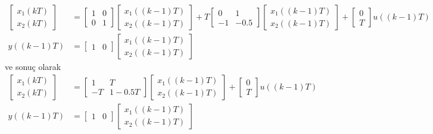 \begin{equation}
    \begin{split}
        \begin{bmatrix}
            x_1(kT)\\
            x_2(kT)
        \end{bmatrix}&=
        \begin{bmatrix}
            1&0\\
            0&1
        \end{bmatrix}
        \begin{bmatrix}
            x_1((k-1)T)\\
            x_2((k-1)T)
        \end{bmatrix}+
        T\begin{bmatrix}
            0& 1\\
            -1& -0.5
        \end{bmatrix}\begin{bmatrix}
            x_1((k-1)T)\\
            x_2((k-1)T)
        \end{bmatrix}+\begin{bmatrix}
            0\\
            T
        \end{bmatrix}u((k-1)T)\\
        y((k-1)T)&=\begin{bmatrix}
            1&0 
        \end{bmatrix}\begin{bmatrix}
            x_1((k-1)T)\\
            x_2((k-1)T)
        \end{bmatrix}
    \end{split}
    \end{equation}
    ve sonuç olarak
        \begin{equation}
            \begin{split}
        \begin{bmatrix}
            x_1(kT)\\
            x_2(kT)
        \end{bmatrix}&=
        \begin{bmatrix}
            1& T\\
            -T& 1-0.5T
        \end{bmatrix}\begin{bmatrix}
            x_1((k-1)T)\\
            x_2((k-1)T)
        \end{bmatrix}+\begin{bmatrix}
            0\\
            T
        \end{bmatrix}u((k-1)T)\\
        y((k-1)T)&=\begin{bmatrix}
            1&0 
        \end{bmatrix}\begin{bmatrix}
            x_1((k-1)T)\\
            x_2((k-1)T)
        \end{bmatrix}\\
    \end{split}
\end{equation}
